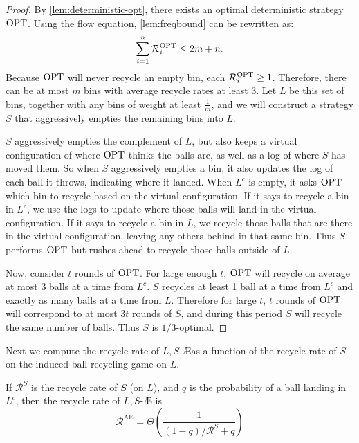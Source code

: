\begin{proof}
	By \cref{lem:deterministic-opt}, there exists an optimal deterministic
	strategy $\textrm{OPT}$. Using the flow equation, \cref{lem:freqbound} can be
	rewritten as:
	\[ \sum_{i=1}^n \mathcal{R}_i^{\textrm{OPT}} \leq 2m + n. \]
	Because $\textrm{OPT}$ will never recycle an empty bin, each $\mathcal{R}_i^{\textrm{OPT}}
	\geq 1$.  Therefore, there can be at most $m$ bins with average recycle
	rates at least 3. Let $L$ be this set of bins, together with any bins of
	weight at least $\frac{1}{m}$, and we will construct a strategy $S$ that
	aggressively empties the remaining bins into $L$.
	
	$S$ aggressively empties the complement of $L$, but also keeps a virtual
	configuration of where $\textrm{OPT}$ thinks the balls are, as well as a log of
	where $S$ has moved them. So when $S$ aggressively empties a bin, it also
	updates the log of each ball it throws, indicating where it landed. When
	$L^c$ is empty, it asks $\textrm{OPT}$ which bin to recycle based on the virtual
	configuration. If it says to recycle a bin in $L^c$, we use the logs to
	update where those balls will land in the virtual configuration. If it says
	to recycle a bin in $L$, we recycle those balls that are there in the
	virtual configuration, leaving any others behind in that same bin.
	Thus $S$ performs $\textrm{OPT}$ but rushes ahead to recycle those balls outside of
	$L$.

	Now, consider $t$ rounds of $\textrm{OPT}$. For large enough $t$, $\textrm{OPT}$ will
	recycle on average at most 3 balls at a time from $L^c$. $S$ recycles at
	least 1 ball at a time from $L^c$ and exactly as many balls at a time from
	$L$.  Therefore for large $t$, $t$ rounds of $\textrm{OPT}$ will correspond to at
	most $3t$ rounds of $S$, and during this period $S$ will recycle the same
	number of balls. Thus $S$ is $1/3$-optimal.
\end{proof}

Next we compute the recycle rate of $L,S$-\AE as a function of the recycle rate
of $S$ on the induced ball-recycling game on $L$.

\begin{lemma}\label{lem:aggro-empty-bounds}
	If $\mathcal{R}^S$ is the recycle rate of $S$ (on $L$), and $q$ is the
	probability of a ball landing in $L^c$, then the recycle rate of $L,S$-\AE
	is
	\[\mathcal{R}^\textrm{AE} = \Theta\left(\frac{1}{(1 - q)/\mathcal{R}^S + q}\right)\]
\end{lemma}

